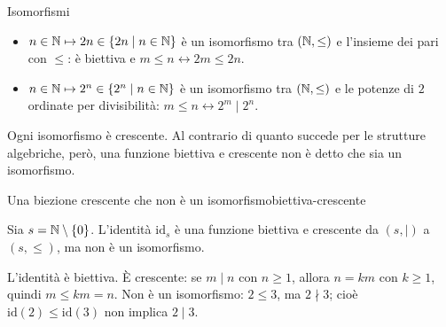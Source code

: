 \begin{esempio}{Isomorfismi}
    \begin{itemize}
        \item $n \in \mathbb{N} \mapsto 2n \in \{2n \mid n \in \mathbb{N}\}$ è un isomorfismo tra $(\mathbb{N}, \leq)$ e l'insieme dei pari con $\leq$:
              è biettiva e $m \leq n \leftrightarrow 2m \leq 2n$.
        \item $n \in \mathbb{N} \mapsto 2^n \in \{2^n \mid n \in \mathbb{N}\}$ è un isomorfismo tra $(\mathbb{N}, \leq)$ e le potenze di $2$ ordinate per
              divisibilità: $m \leq n \leftrightarrow 2^m \mid 2^n$.
    \end{itemize}
\end{esempio}

Ogni isomorfismo è crescente. Al contrario di quanto succede per le strutture algebriche, però, una funzione biettiva e
crescente non è detto che sia un isomorfismo.

\begin{concetto}
\begin{Proposizione}{Una biezione crescente che non è un isomorfismo}{biettiva-crescente}
    \begin{prerequisiti}
    \end{prerequisiti}
    Sia $s = \mathbb{N} \setminus \{0\}$. L'identità $\mathrm{id}_s$ è una funzione biettiva e crescente da $(s, \mid)$ a $(s, \leq)$, ma non è
    un isomorfismo.
\end{Proposizione}
\begin{dimostrazione}
    L'identità è biettiva. È crescente: se $m \mid n$ con $n \geq 1$, allora $n = km$ con $k \geq 1$, quindi $m \leq km = n$.
    Non è un isomorfismo: $2 \leq 3$, ma $2 \nmid 3$; cioè $\mathrm{id}(2) \leq \mathrm{id}(3)$ non implica $2 \mid 3$.
\end{dimostrazione}
\end{concetto}

